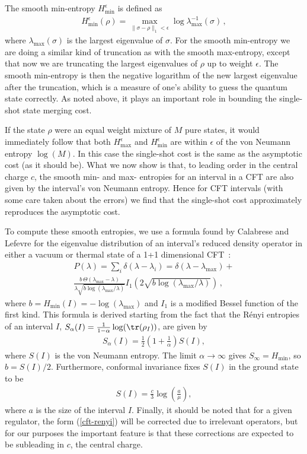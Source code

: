 \documentclass[12pt]{article}
\newcommand{\beq}{\begin{eqnarray}}
\newcommand{\eeq}{\end{eqnarray}}
\newcommand{\Hmax}{H_{\max}}
\newcommand{\Hmin}{H_{\min}}
\newcommand{\lamm}{\lambda_{\max}}
\begin{document}
The smooth min-entropy $\Hmin^\epsilon$ is defined as
\beq
\Hmin^\epsilon(\rho) = \max_{\|\sigma-\rho\|_1 < \epsilon} \log\lamm^{-1}(\sigma)\,,
\eeq
where $\lamm(\sigma)$ is the largest eigenvalue of $\sigma$. For the smooth min-entropy we are doing a similar kind of truncation as with the smooth max-entropy, except that now we are truncating the largest eigenvalues of $\rho$ up to weight $\epsilon$. The smooth min-entropy is then the negative logarithm of the new largest eigenvalue after the truncation, which is a measure of one's ability to guess the quantum state correctly. As noted above, it plays an important role in bounding the single-shot state merging cost.

If the state $\rho$ were an equal weight mixture of $M$ pure states, it would immediately follow that both $\Hmax^\epsilon$ and $\Hmin^\epsilon$ are within $\epsilon$ of the von Neumann entropy $\log(M)$. In this case the single-shot cost is the same as the asymptotic cost (as it should be). What we now show is that, to leading order in the central charge $c$, the smooth min- and max- entropies for an interval in a CFT are also given by the interval's von Neumann entropy. Hence for CFT intervals (with some care taken about the errors) we find that the single-shot cost approximately reproduces the asymptotic cost.

To compute these smooth entropies, we use a formula found by Calabrese and Lefevre for the eigenvalue distribution of an interval's reduced density operator in either a vacuum or thermal state of a 1+1 dimensional CFT~\cite{calabrese-eigs}:
\begin{multline}
P(\lambda) = \sum_i \delta(\lambda - \lambda_i) = \delta(\lambda - \lamm) + \\ 
\frac{b\, \Theta(\lamm - \lambda)}{\lambda \sqrt{b \log(\lamm/\lambda)}} I_1(2 \sqrt{b\log(\lamm/\lambda)})\,,
\end{multline}
where $b = \Hmin(I) = -\log(\lambda_{\max})$ and $I_1$ is a modified Bessel function of the first kind. This formula is derived starting from the fact that the R\'enyi entropies of an interval $I$, $S_\alpha(I) = \frac{1}{1-\alpha}\log(\tr(\rho_I))$, are given by
\beq \label{cft-renyi}
S_\alpha(I) = \frac{1}{2}\left(1 +\frac{1}{\alpha}\right) S(I),
\eeq
where $S(I)$ is the von Neumann entropy. The limit $\alpha \rightarrow \infty$ gives $S_\infty = \Hmin$, so $b = S(I)/2$. Furthermore, conformal invariance fixes $S(I)$ in the ground state to be
\beq
S(I) = \frac{c}{3}\log\left(\frac{a}{\mu}\right),
\eeq
where $a$ is the size of the interval $I$. Finally, it should be noted that for a given regulator, the form (\ref{cft-renyi}) will be corrected due to irrelevant operators, but for our purposes the important feature is that these corrections are expected to be subleading in $c$, the central charge.
\end{document}
